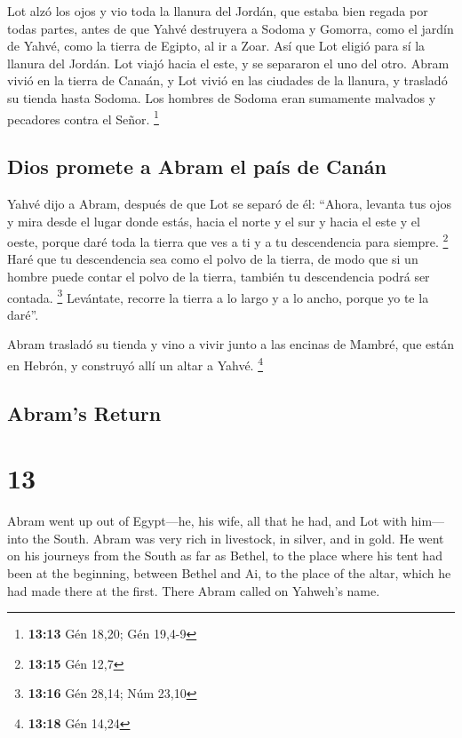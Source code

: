 \begin{paracol}{2}
 Lot alzó los ojos y vio toda la llanura del Jordán, que
estaba bien regada por todas partes, antes de que Yahvé destruyera a
Sodoma y Gomorra, como el jardín de Yahvé, como la tierra de Egipto, al
ir a Zoar.  Así que Lot eligió para sí la llanura del
Jordán. Lot viajó hacia el este, y se separaron el uno del otro.
 Abram vivió en la tierra de Canaán, y Lot vivió en las
ciudades de la llanura, y trasladó su tienda hasta Sodoma.
 Los hombres de Sodoma eran sumamente malvados y
pecadores contra el Señor. \footnote{\textbf{13:13} Gén 18,20; Gén
  19,4-9}

\hypertarget{dios-promete-a-abram-el-pauxeds-de-canuxe1n}{%
\subsection{Dios promete a Abram el país de
Canán}\label{dios-promete-a-abram-el-pauxeds-de-canuxe1n}}

 Yahvé dijo a Abram, después de que Lot se separó de él:
``Ahora, levanta tus ojos y mira desde el lugar donde estás, hacia el
norte y el sur y hacia el este y el oeste,  porque daré
toda la tierra que ves a ti y a tu descendencia para siempre.
\footnote{\textbf{13:15} Gén 12,7}  Haré que tu
descendencia sea como el polvo de la tierra, de modo que si un hombre
puede contar el polvo de la tierra, también tu descendencia podrá ser
contada. \footnote{\textbf{13:16} Gén 28,14; Núm 23,10} 
Levántate, recorre la tierra a lo largo y a lo ancho, porque yo te la
daré''.

 Abram trasladó su tienda y vino a vivir junto a las
encinas de Mambré, que están en Hebrón, y construyó allí un altar a
Yahvé. \footnote{\textbf{13:18} Gén 14,24}

\switchcolumn
\begin{otherlanguage}{english}

\hypertarget{abrams-return}{%
\subsection{Abram's Return}\label{abrams-return}}

\hypertarget{section-25}{%
\section{13}\label{section-25}}

 Abram went up out of Egypt---he, his wife, all that he
had, and Lot with him---into the South.  Abram was very
rich in livestock, in silver, and in gold.  He went on his
journeys from the South as far as Bethel, to the place where his tent
had been at the beginning, between Bethel and Ai,  to the
place of the altar, which he had made there at the first. There Abram
called on Yahweh's name.


\end{otherlanguage}
\end{paracol}
